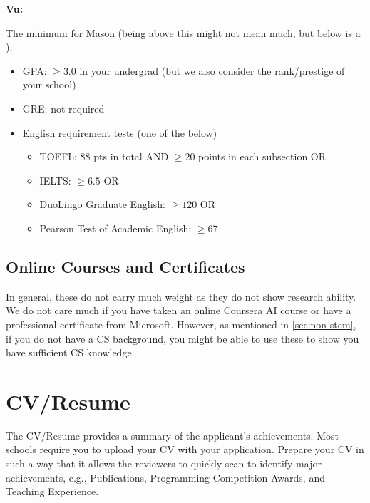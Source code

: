 \documentclass[oneside,11pt,dvipsnames]{book}
\newenvironment{commentbox}[1][]{
  \small
  \begin{mybox}
    {\small \textbf{#1}}
  }{
  \end{mybox}
}
\def\sectioninfo#1{%
  \addcontentsline{toc}{sectioninfo}{%
    \noexpand\numberline{}\color{black}{#1}}%
}
\newcommand{\red}[1]{{\color{red}{#1}}}
\begin{document}
\begin{commentbox}[Vu:]
  The minimum for Mason (being above this might not mean much, but below is a \red{red flag}).
  \begin{itemize}
    \item GPA: $\ge 3.0$ in your undergrad (but we also consider the rank/prestige of your school)
    \item GRE: not required
    \item English requirement tests (one of the below)
          \begin{itemize}
            \item TOEFL: 88 pts in total AND $\ge 20$ points in each subsection OR
            \item IELTS: $\ge 6.5$ OR
            \item DuoLingo Graduate English: $\ge 120$ OR
            \item Pearson Test of Academic English: $\ge 67$
          \end{itemize}
  \end{itemize}
\end{commentbox}


\subsection{Online Courses and Certificates}
In general, these do not carry much weight as they do not show research ability. We do not care much if you have taken an online Coursera AI course or have a professional certificate from Microsoft.
However, as mentioned in \autoref{sec:non-stem}, if you do not have a CS background, you might be able to use these to show you have sufficient CS knowledge.

\section{CV/Resume}
\sectioninfo{Highlight and summarize major achievements, e.g., Publications, Programming Awards}

The CV/Resume provides a summary of the applicant's achievements. Most schools require you to upload your CV with your application.
Prepare your CV in such a way that it allows the reviewers to quickly scan to identify major achievements, e.g., Publications, Programming Competition Awards, and Teaching Experience.
\end{document}
